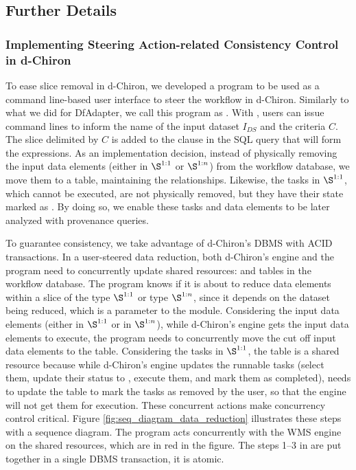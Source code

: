 \subsection{Further Details}
\label{further-implementation-details-dchiron}

\subsubsection{Implementing Steering Action-related Consistency Control in d-Chiron}

To ease slice removal in d-Chiron, we developed a program to be used as a command line-based user interface to steer the workflow in d-Chiron.
Similarly to what we did for DfAdapter, we call this program as .
With , users can issue command lines to inform the name of
the input dataset $I_{DS}$ and the criteria $C$.
The slice delimited by $C$ is added to
the  clause in the SQL query that will form the
 expressions.
As an implementation decision, instead of
physically removing the input data elements (either in $\S^{1:1}$ or
$\S^{1:n}$) from the workflow database, we move them to a 
table, maintaining the relationships. Likewise, the tasks in
$\S^{1:1}$, which cannot be executed, are not physically removed, but
they have their state marked as . By doing so, we
enable these tasks and data elements to be later analyzed with
provenance queries.

To guarantee consistency, we take advantage of d-Chiron's DBMS with ACID
transactions. In a user-steered data reduction, both d-Chiron's engine
and the  program need to concurrently update shared resources: 
and  tables in the workflow database. The  program knows if
it is about to reduce data elements within a slice of the type
$\S^{1:1}$ or type $\S^{1:n}$, since it depends on the dataset being
reduced, which is a parameter to the module. Considering the input
data elements (either in $\S^{1:1}$ or in $\S^{1:n}$), while
d-Chiron's engine gets the input data elements to execute, the  program needs to concurrently move the cut off input data elements to the
 table. Considering the tasks in
$\S^{1:1}$,
the  table is a shared resource because while d-Chiron's engine
updates the runnable tasks (select them, update their status to ,
execute them, and mark them as completed),  needs to update the
 table to mark the tasks as removed by the user, so that the engine will
not get them for execution.
These concurrent actions make concurrency
control critical.
Figure \ref{fig:seq_diagram_data_reduction}  illustrates these steps with a sequence
diagram. The  program acts concurrently with the WMS engine on the
shared resources, which are in red in the figure. The steps 1--3 in 
are put together in a single DBMS transaction,
\ie{} it is atomic.

